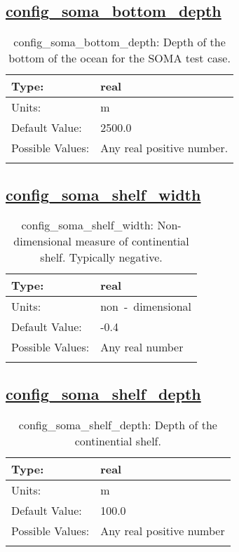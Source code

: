 \subsection[config\_soma\_bottom\_depth]{\hyperref[sec:nm_tab_soma]{config\_soma\_bottom\_depth}}
\label{subsec:nm_sec_config_soma_bottom_depth}
\begin{center}
\begin{longtable}{| p{2.0in} || p{4.0in} |}
    \hline
    Type: & real \\
    \hline
    Units: & \si{m} \\
    \hline
    Default Value: & 2500.0 \\
    \hline
    Possible Values: & Any real positive number. \\
    \hline
    \caption{config\_soma\_bottom\_depth: Depth of the bottom of the ocean for the SOMA test case.}
\end{longtable}
\end{center}
\subsection[config\_soma\_shelf\_width]{\hyperref[sec:nm_tab_soma]{config\_soma\_shelf\_width}}
\label{subsec:nm_sec_config_soma_shelf_width}
\begin{center}
\begin{longtable}{| p{2.0in} || p{4.0in} |}
    \hline
    Type: & real \\
    \hline
    Units: & \si{non-dimensional} \\
    \hline
    Default Value: & -0.4 \\
    \hline
    Possible Values: & Any real number \\
    \hline
    \caption{config\_soma\_shelf\_width: Non-dimensional measure of continential shelf. Typically negative.}
\end{longtable}
\end{center}
\subsection[config\_soma\_shelf\_depth]{\hyperref[sec:nm_tab_soma]{config\_soma\_shelf\_depth}}
\label{subsec:nm_sec_config_soma_shelf_depth}
\begin{center}
\begin{longtable}{| p{2.0in} || p{4.0in} |}
    \hline
    Type: & real \\
    \hline
    Units: & \si{m} \\
    \hline
    Default Value: & 100.0 \\
    \hline
    Possible Values: & Any real positive number \\
    \hline
    \caption{config\_soma\_shelf\_depth: Depth of the continential shelf.}
\end{longtable}
\end{center}
